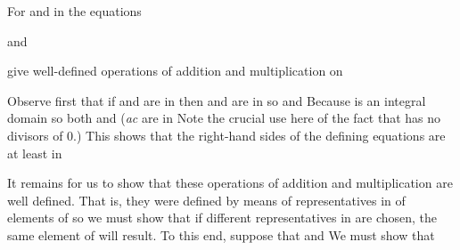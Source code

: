 \documentclass[11pt,oneside]{article}
\begin{document}
\begin{BookBody}

 For \BookInline{[(a,\allowbreak b)]} and \BookInline{[(c,\allowbreak d)]} in  the equations

\begin{center}\begin{adjustbox}{max width=\linewidth}\BookInline{\displaystyle [(a,\allowbreak b)]+ [(c,\allowbreak d)]= [(ad+ bc,\allowbreak bd)]}\end{adjustbox}\end{center}

\noindent and

\begin{center}\begin{adjustbox}{max width=\linewidth}\BookInline{\displaystyle [(a,\allowbreak b)][(c,\allowbreak d)]= [(ac,\allowbreak bd)]}\end{adjustbox}\end{center}

\noindent give well-defined operations of addition and multiplication on 

 Observe first that if \BookInline{[(a,\allowbreak b)]} and \BookInline{[(c,\allowbreak d)]} are in  then  and  are in  so  and  Because  is an integral domain so both  and (\textit{ac} are in Note the crucial use here of the fact that  has no divisors of 0.) This shows that the right-hand sides of the defining equations are at least in 

It remains for us to show that these operations of addition and multiplication are well defined. That is, they were defined by means of representatives in  of elements of  so we must show that if different representatives in  are chosen, the same element of  will result. To this end, suppose that  and  We must show that

\begin{center}\begin{adjustbox}{max width=\linewidth}\end{adjustbox}\end{center}


\end{BookBody}
\end{document}
